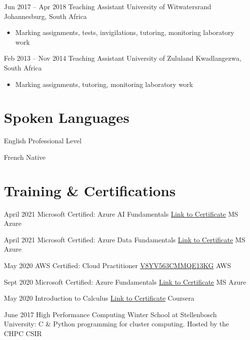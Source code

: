 \documentclass[letterpaper]{moderncv}        %
\begin{document}
\cventry
{Jun 2017 -- Apr 2018}
{Teaching Assistant}
{University of Witwatersrand}
{Johannesburg, South Africa}
{}
{\begin{itemize}%
	\item Marking assignments, tests, invigilations, tutoring, monitoring laboratory work
	\end{itemize}}
\cventry
{Feb 2013 -- Nov 2014}
{Teaching Assistant}
{University of Zululand}
{Kwadlangezwa, South Africa}
{}
{\begin{itemize}%
	\item Marking assignments, tutoring, monitoring laboratory work
	\end{itemize}}

\section{Spoken Languages}

\cventry
{}
{English}
{Professional Level}
{}
{}
{}

\cventry
{}
{French}
{Native}
{}
{}
{}

\section{Training \& Certifications}

\cventry
{April 2021}
{Microsoft Certified: Azure AI Fundamentals}
{\href{https://www.credly.com/badges/80d60ce2-32b0-475e-9959-05b452f9355a/public_url}{Link to Certificate}}
{MS Azure}
{}
{}

\cventry
{April 2021}
{Microsoft Certified: Azure Data Fundamentals}
{\href{https://www.credly.com/badges/a08ad4dc-3cee-4771-9183-561a33e3ae81/public_url}{Link to Certificate}}
{MS Azure}
{}
{}

\cventry
{May 2020}
{AWS Certified: Cloud Practitioner}
{\href{http://aws.amazon.com/verification}{V8YV563CMMQE13KG}}
{AWS}
{}
{}

\cventry
{Sept 2020}
{Microsoft Certified: Azure Fundamentals}
{\href{https://www.youracclaim.com/badges/ee4c4a98-5687-4fcf-8fce-7ee92249e54f?source=linked_in_profile}{Link to Certificate}}
{MS Azure}
{}
{}

\cventry
{May 2020}
{Introduction to Calculus}
{\href{https://www.coursera.org/account/accomplishments/verify/VNY949FASZA2}{Link to Certificate}}
{Coursera}
{}
{}

\cventry
{June 2017}
{High Performance Computing Winter School at Stellenbosch University: C \& Python programming for cluster computing.}
{Hosted by the CHPC}
{CSIR}
{}
{}
			
\end{document}
